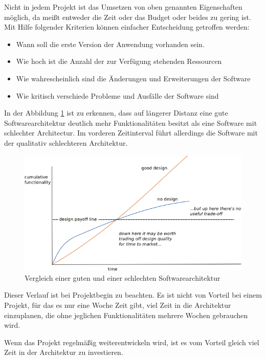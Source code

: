     Nicht in jedem Projekt ist das Umsetzen von oben genannten Eigenschaften möglich, 
    da meißt entweder die Zeit oder das Budget oder beides zu gering ist.
    Mit Hilfe folgender Kriterien können einfacher Entscheidung getroffen werden:
    \begin{itemize}
        \item Wann soll die erste Version der Anwendung vorhanden sein.
        \item Wie hoch ist die Anzahl der zur Verfügung stehenden Ressourcen
        \item Wie wahrescheinlich sind die Änderungen und Erweiterungen der Software
        \item Wie kritisch verschiede Probleme und Ausfälle der Software sind 
    \end{itemize}

    In der Abbildung \ref{fig:softQuality} ist zu erkennen, dass auf längerer Distanz eine gute Softwarearchitektur deutlich mehr Funktionalitäten 
    besitzt als eine Software mit schlechter Architectur. Im vorderen Zeitinterval führt allerdings die Software mit der qualitativ schlechteren Architektur.
    \begin{figure}[H]
        \centering
        \includegraphics[width=1\textwidth]{./images/QASoftwareCompare.png}
        \caption[Vergleich einer guten und einer schlechten Softwarearchitektur]{Vergleich einer guten und einer schlechten Softwarearchitektur \footnotemark}
        \label{fig:softQuality}
    \end{figure}
    Dieser Verlauf ist bei Projektbegin zu beachten. Es ist nicht von Vorteil bei einem Projekt, 
    für das es nur eine Woche Zeit gibt, viel Zeit in die Architektur einzuplanen, die ohne jeglichen Funktionalitäten mehrere Wochen gebrauchen wird.

    Wenn das Projekt regelmäßig weiterentwickeln wird, ist es vom Vorteil gleich viel Zeit in der Architektur zu investieren.
